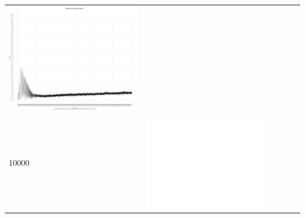 \begin{table}[htbp]
{\begin{tabular}{l | ccccc}
\begin{minipage}{.15\textwidth}
     			 	\includegraphics[width=\linewidth]{images/mema-triple/I13}
    				 \end{minipage}\\
		10000  &	 \begin{minipage}{.15\textwidth}
     			 	\includegraphics[width=\linewidth]{images/mema-triple/I5}
    				 \end{minipage}
    			   &	 \begin{minipage}{.15\textwidth}

\end{minipage}
\end{tabular}}
\end{table}
